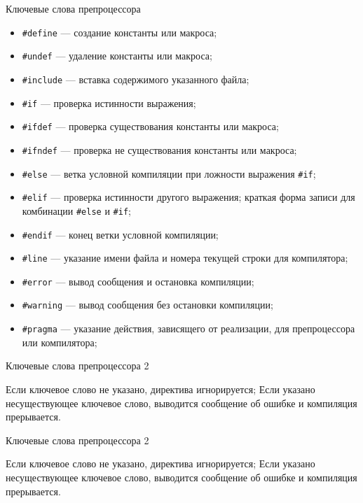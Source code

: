 \begin{frame}[t]{Ключевые слова препроцессора}

  \begin{itemize}
    \item \texttt{\#define} --- создание константы или макроса;
    \item \texttt{\#undef} --- удаление константы или макроса;
    \item \texttt{\#include} --- вставка содержимого указанного файла;
    \item \texttt{\#if} --- проверка истинности выражения;
    \item \texttt{\#ifdef} --- проверка существования константы или макроса;
    \item \texttt{\#ifndef} --- проверка не существования константы или макроса;
    \item \texttt{\#else} --- ветка условной компиляции при ложности выражения \texttt{\#if};
    \item \texttt{\#elif} --- проверка истинности другого выражения; краткая форма записи для комбинации \texttt{\#else} и \texttt{\#if};
    \item \texttt{\#endif} --- конец ветки условной компиляции;
    \item \texttt{\#line} --- указание имени файла и номера текущей строки для компилятора;
    \item \texttt{\#error} --- вывод сообщения и остановка компиляции;
    \item \texttt{\#warning} --- вывод сообщения без остановки компиляции;
    \item \texttt{\#pragma} --- указание действия, зависящего от реализации, для препроцессора или компилятора;
  \end{itemize}
\end{frame}

\begin{frame}[t]{Ключевые слова препроцессора 2}

Если ключевое слово не указано, директива игнорируется;
Если указано несуществующее ключевое слово, выводится сообщение об ошибке и компиляция прерывается.



\end{frame}

\begin{frame}[t,fragile]{Ключевые слова препроцессора 2}

Если ключевое слово не указано, директива игнорируется;
Если указано несуществующее ключевое слово, выводится сообщение об ошибке и компиляция прерывается.

\end{frame}



